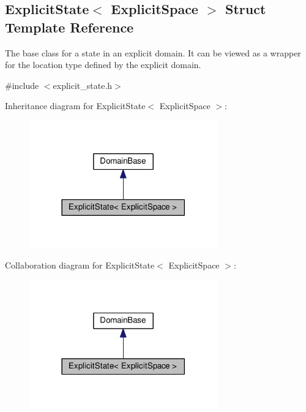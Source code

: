 \hypertarget{structExplicitState}{}\subsection{Explicit\+State$<$ Explicit\+Space $>$ Struct Template Reference}
\label{structExplicitState}


The base class for a state in an explicit domain. It can be viewed as a wrapper for the location type defined by the explicit domain.  




{\ttfamily \#include $<$explicit\+\_\+state.\+h$>$}



Inheritance diagram for Explicit\+State$<$ Explicit\+Space $>$\+:\nopagebreak
\begin{figure}[H]
\begin{center}
\leavevmode
\includegraphics[width=230pt]{structExplicitState__inherit__graph}
\end{center}
\end{figure}


Collaboration diagram for Explicit\+State$<$ Explicit\+Space $>$\+:\nopagebreak
\begin{figure}[H]
\begin{center}
\leavevmode
\includegraphics[width=230pt]{structExplicitState__coll__graph}
\end{center}
\end{figure}
